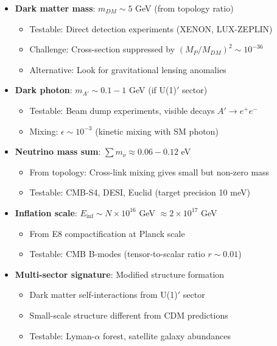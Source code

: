 \documentclass[12pt,a4paper]{article}
\begin{document}
\begin{itemize}
\item \textbf{Dark matter mass}: $m_{DM} \sim 5$ GeV (from topology ratio)
  \begin{itemize}
  \item Testable: Direct detection experiments (XENON, LUX-ZEPLIN)
  \item Challenge: Cross-section suppressed by $(M_P/M_{DM})^2 \sim 10^{-36}$
  \item Alternative: Look for gravitational lensing anomalies
  \end{itemize}

\item \textbf{Dark photon}: $m_{A'} \sim 0.1-1$ GeV (if U(1)$'$ sector)
  \begin{itemize}
  \item Testable: Beam dump experiments, visible decays $A' \to e^+ e^-$
  \item Mixing: $\epsilon \sim 10^{-3}$ (kinetic mixing with SM photon)
  \end{itemize}

\item \textbf{Neutrino mass sum}: $\sum m_\nu \approx 0.06-0.12$ eV
  \begin{itemize}
  \item From topology: Cross-link mixing gives small but non-zero mass
  \item Testable: CMB-S4, DESI, Euclid (target precision 10 meV)
  \end{itemize}

\item \textbf{Inflation scale}: $E_{\inf} \sim N \times 10^{16}$ GeV $\approx 2 \times 10^{17}$ GeV
  \begin{itemize}
  \item From E8 compactification at Planck scale
  \item Testable: CMB B-modes (tensor-to-scalar ratio $r \sim 0.01$)
  \end{itemize}

\item \textbf{Multi-sector signature}: Modified structure formation
  \begin{itemize}
  \item Dark matter self-interactions from U(1)$'$ sector
  \item Small-scale structure different from CDM predictions
  \item Testable: Lyman-$\alpha$ forest, satellite galaxy abundances
  \end{itemize}
\end{itemize}
\end{document}
